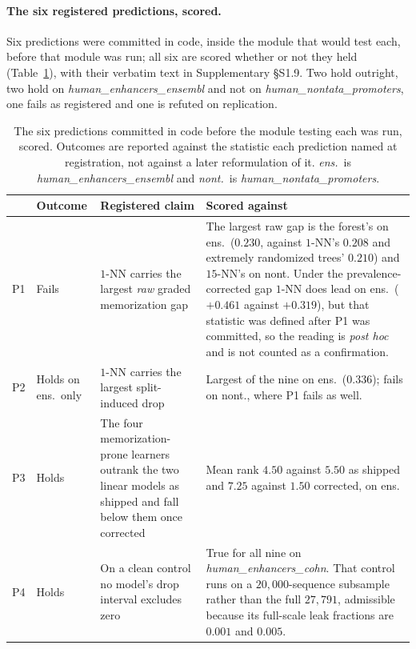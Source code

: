 \documentclass[webpdf,modern,large,namedate]{oup-authoring-template}%
\begin{document}
\paragraph{The six registered predictions, scored.} Six predictions were committed in code, inside the module that would test each, before that module was run; all six are scored whether or not they held (Table~\ref{tab:prereg}), with their verbatim text in Supplementary \S S1.9. Two hold outright, two hold on \textit{human\_enhancers\_ensembl} and not on \textit{human\_nontata\_promoters}, one fails as registered and one is refuted on replication.

\begin{table}[tbp]
\begin{center}
\begin{minipage}{\textwidth}
\caption{The six predictions committed in code before the module testing each was run, scored. Outcomes are reported against the statistic each prediction named at registration, not against a later reformulation of it. \emph{ens.}~is \textit{human\_enhancers\_ensembl} and \emph{nont.}~is \textit{human\_nontata\_promoters}.\label{tab:prereg}}
\footnotesize\setlength{\tabcolsep}{4pt}\begin{tabular}{@{}llp{}p{}@{}}
\toprule
& Outcome & Registered claim & Scored against\\
\midrule
P1 & Fails & $1$-NN carries the largest \emph{raw} graded memorization gap & The largest raw gap is the forest's on ens.\ ($0.230$, against $1$-NN's $0.208$ and extremely randomized trees' $0.210$) and $15$-NN's on nont. Under the prevalence-corrected gap $1$-NN does lead on ens.\ ($+0.461$ against $+0.319$), but that statistic was defined after P1 was committed, so the reading is \emph{post hoc} and is not counted as a confirmation.\\
P2 & Holds on ens.\ only & $1$-NN carries the largest split-induced drop & Largest of the nine on ens.\ ($0.336$); fails on nont., where P1 fails as well.\\
P3 & Holds & The four memorization-prone learners outrank the two linear models as shipped and fall below them once corrected & Mean rank $4.50$ against $5.50$ as shipped and $7.25$ against $1.50$ corrected, on ens.\\
P4 & Holds & On a clean control no model's drop interval excludes zero & True for all nine on \textit{human\_enhancers\_cohn}. That control runs on a $20{,}000$-sequence subsample rather than the full $27{,}791$, admissible because its full-scale leak fractions are $0.001$ and $0.005$.\\

\end{tabular}
\end{minipage}
\end{center}
\end{table}
\end{document}
